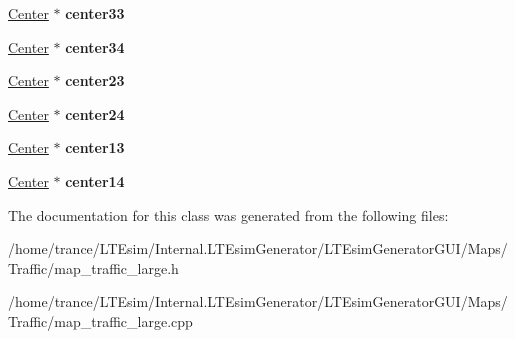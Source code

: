\begin{DoxyCompactItemize}
\item 
\hyperlink{class_center}{Center} $\ast$ {\bfseries center33}\hypertarget{class_map__traffic__large_aaba5914ed8d8ae957bd5aeffec406210}{}\label{class_map__traffic__large_aaba5914ed8d8ae957bd5aeffec406210}

\item 
\hyperlink{class_center}{Center} $\ast$ {\bfseries center34}\hypertarget{class_map__traffic__large_ab7dffb063e8f5db6d0a7c5ff5637451b}{}\label{class_map__traffic__large_ab7dffb063e8f5db6d0a7c5ff5637451b}

\item 
\hyperlink{class_center}{Center} $\ast$ {\bfseries center23}\hypertarget{class_map__traffic__large_af9704a457f1d3f88399de5a61c6ecef8}{}\label{class_map__traffic__large_af9704a457f1d3f88399de5a61c6ecef8}

\item 
\hyperlink{class_center}{Center} $\ast$ {\bfseries center24}\hypertarget{class_map__traffic__large_a5699f66d9c8b795084296f86a8ec3e3a}{}\label{class_map__traffic__large_a5699f66d9c8b795084296f86a8ec3e3a}

\item 
\hyperlink{class_center}{Center} $\ast$ {\bfseries center13}\hypertarget{class_map__traffic__large_a7546fbab7a1f26e1bb05a143bb0800ae}{}\label{class_map__traffic__large_a7546fbab7a1f26e1bb05a143bb0800ae}

\item 
\hyperlink{class_center}{Center} $\ast$ {\bfseries center14}\hypertarget{class_map__traffic__large_ab909b7dd271303f55158157095a63087}{}\label{class_map__traffic__large_ab909b7dd271303f55158157095a63087}

\end{DoxyCompactItemize}


The documentation for this class was generated from the following files\+:\begin{DoxyCompactItemize}
\item 
/home/trance/\+L\+T\+Esim/\+Internal.\+L\+T\+Esim\+Generator/\+L\+T\+Esim\+Generator\+G\+U\+I/\+Maps/\+Traffic/map\+\_\+traffic\+\_\+large.\+h\item 
/home/trance/\+L\+T\+Esim/\+Internal.\+L\+T\+Esim\+Generator/\+L\+T\+Esim\+Generator\+G\+U\+I/\+Maps/\+Traffic/map\+\_\+traffic\+\_\+large.\+cpp\end{DoxyCompactItemize}
